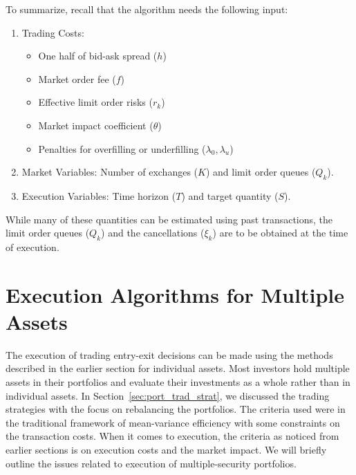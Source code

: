 To summarize, recall that the algorithm needs the following input:
	\begin{enumerate}[--]
	\item Trading Costs: 
		\begin{itemize}
		\item One half of bid-ask spread ($h$)
		\item Market order fee ($f$)
		\item Effective limit order risks ($r_k$)
		\item Market impact coefficient ($\theta$)
		\item Penalties for overfilling or underfilling ($\lambda_0,\lambda_u$)
		\end{itemize}
	\item Market Variables: Number of exchanges ($K$) and limit order queues ($Q_k$).
	\item Execution Variables: Time horizon ($T$) and target quantity ($S$).
	\end{enumerate}
While many of these quantities can be estimated using past transactions, the limit order queues ($Q_k$) and the cancellations ($\xi_k$) are to be obtained at the time of execution.



\section{Execution Algorithms for Multiple Assets}

The execution of trading entry-exit decisions can be made using the methods described in the earlier section for individual assets. Most investors hold multiple assets in their portfolios and evaluate their investments as a whole rather than in individual assets. In Section~\ref{sec:port_trad_strat}, we discussed the trading strategies with the focus on rebalancing the portfolios. The criteria used were in the traditional framework of mean-variance efficiency with some constraints on the transaction costs. When it comes to execution, the criteria as noticed from earlier sections is on execution costs and the market impact. We will briefly outline the issues related to execution of multiple-security portfolios.




